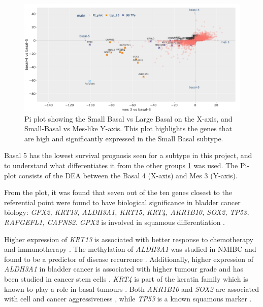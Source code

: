 \begin{figure}[!htb]   
    \centering
    \includegraphics[width=1.0\textwidth,keepaspectratio]{Sections/Network_I/Resources/selective_pruning/pi_gsea/pi_smallBasal.png}
      \caption[Pi-plot to study the Basal group with lowest survival]{Pi plot showing the Small Basal vs Large Basal on the X-axis, and Small-Basal vs Mes-like Y-axis. This plot highlights the genes that are high and significantly expressed in the Small Basal subtype. }
    \label{fig:N_I:pi_smallBasal_comp}
\end{figure}


Basal 5 has the lowest survival prognosis seen for a subtype in this project, and to understand what differentiates it from the other groups \cref{fig:N_I:pi_smallBasal_comp} was used. The Pi-plot consists of the DEA between the Basal 4 (X-axis) and Mes 3 (Y-axis).

From the plot, it was found that seven out of the ten genes closest to the referential point were found to have biological significance in bladder cancer biology: \textit{GPX2, KRT13, ALDH3A1, KRT15, KRT4, AKR1B10, SOX2, TP53, RAPGEFL1, CAPNS2}. \textit{GPX2} is involved in squamous differentiation \citet{Naiki2018-fp}. 

Higher expression of \textit{KRT13} is associated with better response to chemotherapy and immunotherapy \citep{Yu2023-db}. The methylation of \textit{ALDH3A1} was studied in \gls{NMIBC} and found to be a predictor of disease recurrence \citep{McLean2023-qk}. Additionally, higher expression of \textit{ALDH3A1} in bladder cancer is associated with higher tumour grade and has been studied in cancer stem cells \citep{Kim2013-th}. \textit{KRT4} is part of the keratin family which is known to play a role in basal tumours \citep{Marzouka2018-ge}. Both \textit{AKR1B10} and \textit{SOX2} are associated with cell and cancer aggressiveness \citep{Huang2021-bn, Chiu2020-xh}, while \textit{TP53} is a known squamous marker \citep{Robertson2017-mg}. 

